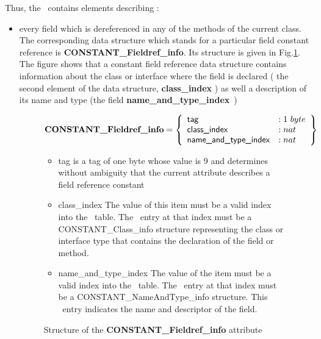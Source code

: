 Thus, the \constantPool \ contains elements describing :
\begin{itemize}
  \item every field which is dereferenced in any of the methods
of the current class. The corresponding data structure which stands for a particular field constant reference is 
 \textbf{CONSTANT\_Fieldref\_info}. Its structure is given in Fig.\ref{fldConstant}. The figure shows that
 a constant  field reference data structure contains information about the class or interface where the field is declared 
( the second element of the data structure, \textbf{class\_index}  )
 as well a description of its name and type (the field \textbf{name\_and\_type\_index}~)
   \begin{figure}
$$
\mbox{\rm\textbf{CONSTANT\_Fieldref\_info}} =  \left\{\begin{array}{ll} 
                                                   \mbox{\rm\textsf{tag}}    & :  1 \ byte \\
                                                   \mbox{\rm\textsf{class\_index}}     & :   nat \\
						   \mbox{\rm\textsf{name\_and\_type\_index}} & : nat
	                        \end{array} \right\}$$

\begin{itemize}
\item \textsf{tag} is a tag of one byte  whose value is 9 and  determines without 
       ambiguity that the current attribute describes a field reference constant

\item \textsf{class\_index} The value of this item must be a valid index into the \constantPool \ table. 
                            The \constantPool \ entry at that index must be a \textsf{CONSTANT\_Class\_info} structure
			    representing the class or interface type that contains the declaration of the field or method.

\item \textsf{name\_and\_type\_index}   The value of the item must be a valid index into the \constantPool \ table.
                                        The \constantPool \ entry at that index must be a \textsf{CONSTANT\_NameAndType\_info }
					structure. This \constantPool \ entry indicates the name and descriptor of the field.

\end{itemize}
\caption{ { \sc Structure of the } \textbf{CONSTANT\_Fieldref\_info} { \sc attribute }  }
\label{fldConstant}
\end{figure}


\end{itemize}
